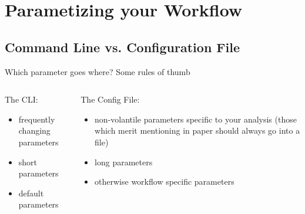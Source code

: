 
\section{Parametizing your Workflow}

\subsection{Command Line vs. Configuration File}

\begin{frame}
  \pause
  \begin{exampleblock}{Which parameter goes where? Some rules of thumb}
    \begin{columns}[t]
      \begin{column}{0.5\textwidth}
        The CLI:
        \begin{itemize}
         \item frequently changing parameters
         \item short parameters
         \item default parameters
        \end{itemize}
      \end{column}
      \begin{column}{0.5\textwidth}
        The Config File:
        \begin{itemize}
         \item non-volantile parameters specific to your analysis (those which merit mentioning in paper should always go into a file)
         \item long parameters
         \item otherwise workflow specific parameters
        \end{itemize}
      \end{column}
    \end{columns}
  \end{exampleblock}
\end{frame}


